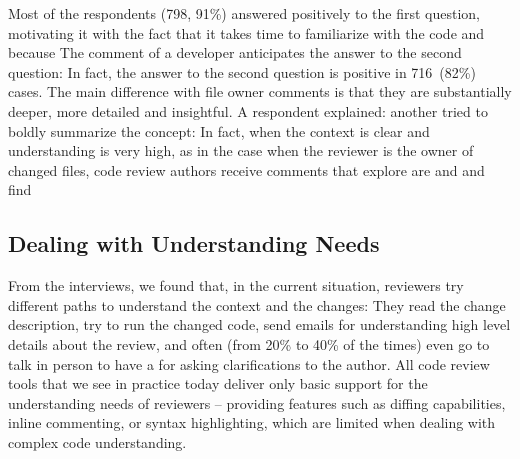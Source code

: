 Most of the respondents (798, 91\%) answered positively to the first question, motivating it with the fact that it takes time to familiarize with the code and  because  The comment of a developer anticipates the answer to the second question:  In fact, the answer to the second question is positive in 716~(82\%) cases. The main difference with file owner comments is that they are substantially deeper, more detailed and insightful. A respondent explained:  another tried to boldly summarize the concept: 
In fact, when the context is clear and understanding is very high, as in the case when the reviewer is the owner of changed files, code review authors receive comments that explore  are  and  and find 


\subsection{Dealing with Understanding Needs}

From the interviews, we found that, in the current situation, reviewers try different paths to understand the context and the changes: They read the change description, try to run the changed code, send emails for understanding high level details about the review, and often (from 20\% to 40\% of the times) even go to talk in person to have a  for asking clarifications to the author. All code review tools that we see in practice today deliver only basic support for the understanding needs of reviewers -- providing features such as diffing capabilities, inline commenting, or syntax highlighting, which are limited when dealing with complex code understanding.